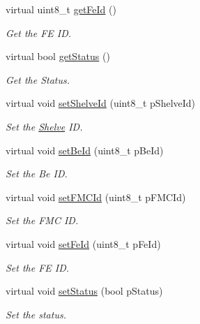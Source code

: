 \begin{DoxyCompactItemize}
virtual uint8\-\_\-t \hyperlink{class_ph2___hw_description_1_1_front_end_description_ad06faa4f2096e3324857a0c6d0b227b4}{get\-Fe\-Id} ()
\begin{DoxyCompactList}\small\item\em Get the F\-E I\-D. \end{DoxyCompactList}\item 
virtual bool \hyperlink{class_ph2___hw_description_1_1_front_end_description_ad5b25135c78f750c36673a8861395426}{get\-Status} ()
\begin{DoxyCompactList}\small\item\em Get the Status. \end{DoxyCompactList}\item 
virtual void \hyperlink{class_ph2___hw_description_1_1_front_end_description_ad8522840adcba97f71d87b315607ef87}{set\-Shelve\-Id} (uint8\-\_\-t p\-Shelve\-Id)
\begin{DoxyCompactList}\small\item\em Set the \hyperlink{class_ph2___hw_description_1_1_shelve}{Shelve} I\-D. \end{DoxyCompactList}\item 
virtual void \hyperlink{class_ph2___hw_description_1_1_front_end_description_a6d19378baeda5d0d8642ef2a5a816063}{set\-Be\-Id} (uint8\-\_\-t p\-Be\-Id)
\begin{DoxyCompactList}\small\item\em Set the Be I\-D. \end{DoxyCompactList}\item 
virtual void \hyperlink{class_ph2___hw_description_1_1_front_end_description_a4e448dce16bc4cb2ae190c8317ed6051}{set\-F\-M\-C\-Id} (uint8\-\_\-t p\-F\-M\-C\-Id)
\begin{DoxyCompactList}\small\item\em Set the F\-M\-C I\-D. \end{DoxyCompactList}\item 
virtual void \hyperlink{class_ph2___hw_description_1_1_front_end_description_a1634e0a0210f38fb1fa38a5ed999665c}{set\-Fe\-Id} (uint8\-\_\-t p\-Fe\-Id)
\begin{DoxyCompactList}\small\item\em Set the F\-E I\-D. \end{DoxyCompactList}\item 
virtual void \hyperlink{class_ph2___hw_description_1_1_front_end_description_a6c0059cd716aac39f3fa6ee4acae09d9}{set\-Status} (bool p\-Status)
\begin{DoxyCompactList}\small\item\em Set the status. \end{DoxyCompactList}\end{DoxyCompactItemize}
